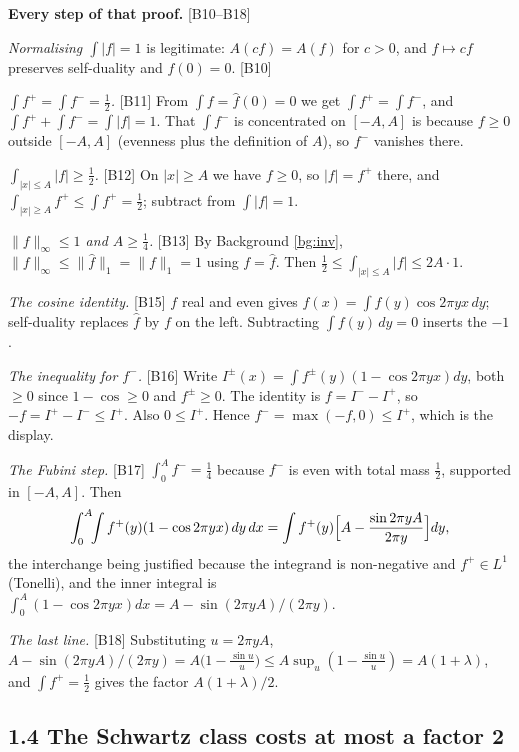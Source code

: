 \documentclass[11pt,reqno]{amsart}
\theoremstyle{plain}
\theoremstyle{definition}
\theoremstyle{remark}
\newcommand{\fh}{\widehat{f}}
\newcommand{\Ledger}[1]{{\scriptsize\textsf{[#1]}}}
\begin{document}
\begin{expansion}
\textbf{Every step of that proof.} \Ledger{B10--B18}

\emph{Normalising $\int|f|=1$} is legitimate: $A(cf)=A(f)$ for $c>0$, and
$f\mapsto cf$ preserves self-duality and $f(0)=0$. \Ledger{B10}

\emph{$\int f^+=\int f^-=\tfrac12$.} \Ledger{B11} From $\int f=\fh(0)=0$ we get
$\int f^+=\int f^-$, and $\int f^++\int f^-=\int|f|=1$. That $\int f^-$ is
concentrated on $[-A,A]$ is because $f\ge0$ outside $[-A,A]$ (evenness plus the
definition of $A$), so $f^-$ vanishes there.

\emph{$\int_{|x|\le A}|f|\ge\tfrac12$.} \Ledger{B12} On $|x|\ge A$ we have $f\ge0$, so
$|f|=f^+$ there, and $\int_{|x|\ge A}f^+\le\int f^+=\tfrac12$; subtract from
$\int|f|=1$.

\emph{$\|f\|_\infty\le1$ and $A\ge\tfrac14$.} \Ledger{B13} By Background \ref{bg:inv},
$\|f\|_\infty\le\|\fh\|_1=\|f\|_1=1$ using $f=\fh$. Then
$\tfrac12\le\int_{|x|\le A}|f|\le 2A\cdot1$.

\emph{The cosine identity.} \Ledger{B15} $f$ real and even gives
$\fh(x)=\int f(y)\cos2\pi yx\,dy$; self-duality replaces $\fh$ by $f$ on the left.
Subtracting $\int f(y)\,dy=0$ inserts the $-1$.

\emph{The inequality for $f^-$.} \Ledger{B16} Write $I^\pm(x)=\int
f^\pm(y)(1-\cos2\pi yx)dy$, both $\ge0$ since $1-\cos\ge0$ and $f^\pm\ge0$. The
identity is $f=I^--I^+$, so $-f=I^+-I^-\le I^+$. Also $0\le I^+$. Hence
$f^-=\max(-f,0)\le I^+$, which is the display.

\emph{The Fubini step.} \Ledger{B17} $\int_0^Af^-=\tfrac14$ because $f^-$ is even with
total mass $\tfrac12$, supported in $[-A,A]$. Then
\[\int_0^A\!\!\int f^+(y)(1-\cos2\pi yx)\,dy\,dx
 =\int f^+(y)\Bigl[A-\frac{\sin2\pi yA}{2\pi y}\Bigr]dy,\]
the interchange being justified because the integrand is non-negative and
$f^+\in L^1$ (Tonelli), and the inner integral is
$\int_0^A(1-\cos2\pi yx)dx=A-\sin(2\pi yA)/(2\pi y)$.

\emph{The last line.} \Ledger{B18} Substituting $u=2\pi yA$,
$A-\sin(2\pi yA)/(2\pi y)=A\bigl(1-\frac{\sin u}{u}\bigr)\le A\sup_u(1-\frac{\sin
u}{u})=A(1+\lambda)$, and $\int f^+=\tfrac12$ gives the factor $A(1+\lambda)/2$.
\end{expansion}

\subsection*{1.4 The Schwartz class costs at most a factor 2}
\end{document}
